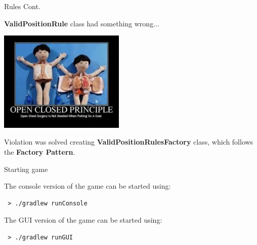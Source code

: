 \documentclass{beamer}
\begin{document}
  \begin{frame} {Rules Cont.}

    \textbf{ValidPositionRule} class had something wrong...

    \vspace{1em}


    \pause
    \hfill
    \includegraphics[width=0.45\textwidth]{img/openclosedprinciple.jpeg}

    \pause

    \vspace{1em}

    Violation was solved creating \textbf{ValidPositionRulesFactory} class, which follows the \textbf{Factory Pattern}.

  \end{frame}





  \begin{frame}[fragile]{Starting game}

    The console version of the game can be started using:

    \begin{lstlisting}
 > ./gradlew runConsole
    \end{lstlisting}

    \vspace{3em}

    The GUI version of the game can be started using:

    \begin{lstlisting} 
 > ./gradlew runGUI
    \end{lstlisting}

  \end{frame}
\end{document}
